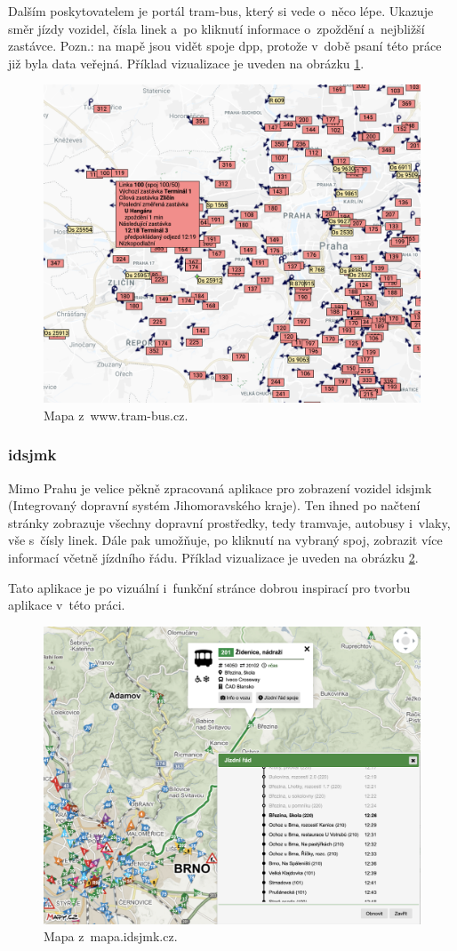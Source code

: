 Dalším poskytovatelem je portál tram-bus, který si vede o~něco lépe. Ukazuje směr jízdy vozidel, čísla linek a~po kliknutí informace o~zpoždění a~nejbližší zastávce. Pozn.: na mapě jsou vidět spoje \gls{dpp}, protože v~době psaní této práce již byla data veřejná. Příklad vizualizace je uveden na obrázku \ref{fig:tram-bus_result}.

\begin{figure}
	\centering
  \includegraphics[width=0.5\linewidth]{../img/tram-bus_mapa.png}
  \caption{Mapa z~www.tram-bus.cz.}
  \label{fig:tram-bus_result}
\end{figure}

\subsubsection{\gls{idsjmk}}

Mimo Prahu je velice pěkně zpracovaná aplikace pro zobrazení vozidel \gls{idsjmk} (Integrovaný dopravní systém Jihomoravského kraje). Ten ihned po načtení stránky zobrazuje všechny dopravní prostředky, tedy tramvaje, autobusy i~vlaky, vše s~čísly linek. Dále pak umožňuje, po kliknutí na vybraný spoj, zobrazit více informací včetně jízdního řádu. Příklad vizualizace je uveden na obrázku \ref{fig:idsjmk_result}.

\bigbreak

Tato aplikace je po vizuální i~funkční stránce dobrou inspirací pro tvorbu aplikace v~této práci.

\begin{figure}
	\centering
  \includegraphics[width=0.5\linewidth]{../img/idsjmk_mapa.png}
  \caption{Mapa z~mapa.idsjmk.cz.}
  \label{fig:idsjmk_result}
\end{figure}

